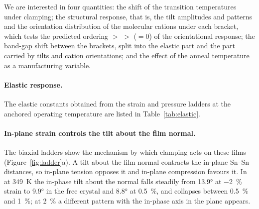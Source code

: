 {We are interested in four quantities: the shift of the transition temperatures under clamping;
the structural response, that is, the tilt amplitudes and patterns and the orientation
distribution of the molecular cations under each bracket, which tests the predicted ordering
\MASnI{} $>$ \FASnI{} $>$ \CsSnI{} ($=0$) of the orientational response; the band-gap shift
between the brackets, split into the elastic part and the part carried by tilts and cation
orientations; and the effect of the anneal temperature as a manufacturing variable.

\paragraph{Elastic response.}

The elastic constants obtained from the strain and pressure ladders at the anchored
operating temperature are listed in Table~\ref{tab:elastic}. 

\paragraph{In-plane strain controls the tilt about the film normal.}

The biaxial ladders show the mechanism by which clamping acts on these films
(Figure~\ref{fig:ladder}a). A tilt about the film normal contracts the in-plane
Sn--Sn distances, so in-plane tension opposes it and in-plane compression favours it. In
\CsSnI{} at \SI{349}{K} the in-phase tilt about the normal falls steadily from
\ang{13.9} at \SI{-2}{\percent} strain to \ang{9.9} in the free crystal and \ang{8.8}
at \SI{+0.5}{\percent}, and collapses between \SI{+0.5}{\percent} and
\SI{+1}{\percent}; at \SI{+2}{\percent} a different pattern with the in-phase axis in the
plane appears. 

}
